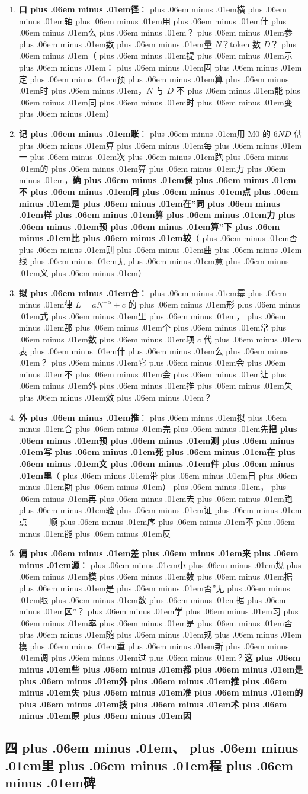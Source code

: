 \documentclass[
]{article}
\providecommand{\tightlist}{%
  \setlength{\itemsep}{0pt}\setlength{\parskip}{0pt}}
\def\zh#1{{\zhfont #1}}
\def\zhglue{\hskip0pt plus .06em minus .01em}
\begin{document}
\begin{enumerate}
\def\labelenumi{\arabic{enumi}.}
\tightlist
\item
  \textbf{\zh{口\zhglue 径}}\zh{：\zhglue 横\zhglue 轴\zhglue 用\zhglue 什\zhglue 么\zhglue ？\zhglue 参\zhglue 数\zhglue 量} \(N\)\zh{？}token \zh{数} \(D\)\zh{？\zhglue （\zhglue 提\zhglue 示\zhglue ：\zhglue 固\zhglue 定\zhglue 预\zhglue 算\zhglue 时\zhglue ，}\(N\) \zh{与} \(D\) \zh{不\zhglue 能\zhglue 同\zhglue 时\zhglue 变\zhglue ）}
\item
  \textbf{\zh{记\zhglue 账}}\zh{：\zhglue 用} M0 \zh{的} \(6ND\) \zh{估\zhglue 算\zhglue 每\zhglue 一\zhglue 次\zhglue 跑\zhglue 的\zhglue 算\zhglue 力\zhglue ，}\textbf{\zh{确\zhglue 保\zhglue 不\zhglue 同\zhglue 点\zhglue 是\zhglue 在}''\zh{同\zhglue 样\zhglue 算\zhglue 力\zhglue 预\zhglue 算}''\zh{下\zhglue 比\zhglue 较}}\zh{（\zhglue 否\zhglue 则\zhglue 曲\zhglue 线\zhglue 无\zhglue 意\zhglue 义\zhglue ）}
\item
  \textbf{\zh{拟\zhglue 合}}\zh{：\zhglue 幂\zhglue 律} \(L = aN^{-\alpha} + c\) \zh{的\zhglue 形\zhglue 式\zhglue 里\zhglue ，\zhglue 那\zhglue 个\zhglue 常\zhglue 数\zhglue 项} \(c\) \zh{代\zhglue 表\zhglue 什\zhglue 么\zhglue ？\zhglue 它\zhglue 会\zhglue 不\zhglue 会\zhglue 让\zhglue 外\zhglue 推\zhglue 失\zhglue 效\zhglue ？}
\item
  \textbf{\zh{外\zhglue 推}}\zh{：\zhglue 拟\zhglue 合\zhglue 完\zhglue 先}\textbf{\zh{把\zhglue 预\zhglue 测\zhglue 写\zhglue 死\zhglue 在\zhglue 文\zhglue 件\zhglue 里}}\zh{（\zhglue 带\zhglue 日\zhglue 期\zhglue ）\zhglue ，\zhglue 再\zhglue 去\zhglue 跑\zhglue 验\zhglue 证\zhglue 点} ------ \zh{顺\zhglue 序\zhglue 不\zhglue 能\zhglue 反}
\item
  \textbf{\zh{偏\zhglue 差\zhglue 来\zhglue 源}}\zh{：\zhglue 小\zhglue 规\zhglue 模\zhglue 数\zhglue 据\zhglue 是\zhglue 否}''\zh{无\zhglue 限\zhglue 数\zhglue 据\zhglue 区}''\zh{？\zhglue 学\zhglue 习\zhglue 率\zhglue 是\zhglue 否\zhglue 随\zhglue 规\zhglue 模\zhglue 重\zhglue 新\zhglue 调\zhglue 过\zhglue ？}\textbf{\zh{这\zhglue 些\zhglue 都\zhglue 是\zhglue 外\zhglue 推\zhglue 失\zhglue 准\zhglue 的\zhglue 技\zhglue 术\zhglue 原\zhglue 因}}
\end{enumerate}

\subsection{\zh{四\zhglue 、\zhglue 里\zhglue 程\zhglue 碑}}\label{ux56dbux91ccux7a0bux7891}
\end{document}
